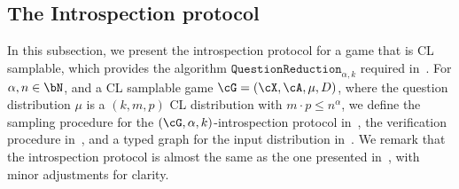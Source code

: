 
\subsection{The Introspection protocol} \label{sec:introspectionprotocol}

In this subsection, we present the introspection protocol for a game that is CL samplable, which provides the algorithm  $\texttt{QuestionReduction}_{\alpha, k}$ required in~. For $\alpha, n \in \bN$, and a CL samplable game $\cG = (\cX, \cA, \mu, D)$, where the question distribution $\mu$ is a $(k,m,p)$ CL distribution with $m \cdot p \leq n^{\alpha}$, we define the sampling procedure for the $(\cG,\alpha, k)$-introspection protocol in~, the verification procedure in~, and a typed graph for the input distribution in~. We remark that the introspection protocol is almost the same as the one presented in~\cite[Figure 10]{jiMIPRE2022a}, with minor adjustments for clarity. 



